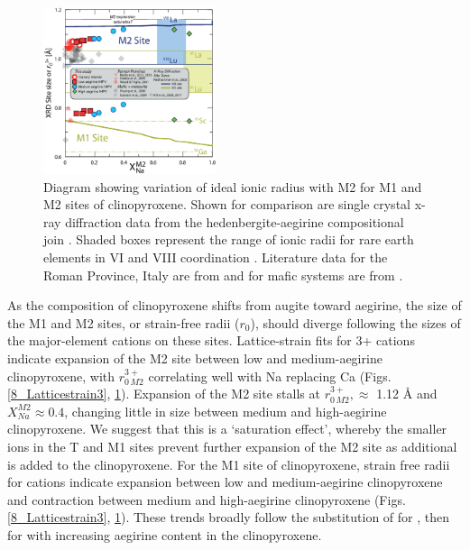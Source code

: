 \documentclass[final,authoryear,3p,times,twocolumn]{elsarticle}
\begin{document}
        \begin{figure}[bt]
        \begin{center}
        \includegraphics[width=0.45\textwidth]{9_Px_XRD_Jun2017-01.eps}
        \caption[Variation of ideal ionic radius $r_0^{3+}$ with M2 for M1 and M2 sites of clinopyroxene]{Diagram showing variation of ideal ionic radius  with M2 for M1 and M2 sites of clinopyroxene. Shown for comparison are single crystal x-ray diffraction data from the hedenbergite-aegirine compositional join \citep[heavy solid lines, from][]{Redhammer2006}. Shaded boxes represent the range of ionic radii for rare earth elements in VI and VIII coordination \citep{Shannon1976}. Literature data for the Roman Province, Italy are from \citet{Fedele2009, Mollo2013, Mollo2016, Wood2001cpx} and for mafic systems are from \citet{Hill2000, Hill2011, Gaetani2004, Huang2006}.}
        \label{9_Px_XRD}
        \end{center}
        \end{figure}
        
	As the composition of clinopyroxene shifts from augite toward aegirine, the size of the M1 and M2 sites, or strain-free radii ($r_0$), should diverge following the sizes of the major-element cations on these sites.
	Lattice-strain fits for 3+ cations indicate expansion of the M2 site between low and medium-aegirine clinopyroxene, with $r_{0\, M2}^{3+}$ correlating well with Na replacing Ca (Figs. \ref{8_Latticestrain3}, \ref{9_Px_XRD}). Expansion of the M2 site stalls at $r_{0\, M2}^{3+}, \approx$ 1.12 \si{\angstrom}{} and $X_{Na}^{M2} \approx 0.4$, changing little in size between medium and high-aegirine clinopyroxene. We suggest that this is a `saturation effect', whereby the smaller ions in the T and M1 sites prevent further expansion of the M2 site as additional  is added to the clinopyroxene. 	
	For the M1 site of clinopyroxene, strain free radii for  cations indicate expansion between low and medium-aegirine clinopyroxene and contraction between medium and high-aegirine clinopyroxene (Figs. \ref{8_Latticestrain3}, \ref{9_Px_XRD}). These trends broadly follow the substitution of  for , then  for  with increasing aegirine content in the clinopyroxene.
	
\end{document}
